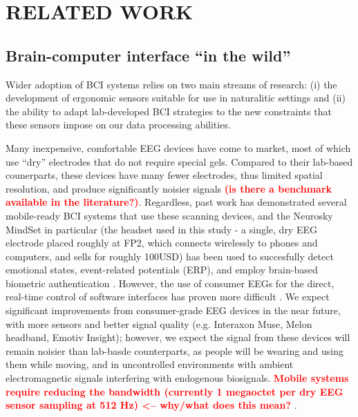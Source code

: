 \section{\uppercase{Related Work}}
\subsection{Brain-computer interface ``in the wild''}

\noindent Wider adoption of BCI systems relies on two main streams of research: (i) the development of ergonomic sensors suitable for use in naturalitic settings and (ii) the ability to adapt lab-developed BCI strategies to the new constraints that these sensors impose on our data processing abilities. 

Many inexpensive, comfortable EEG devices have come to market, most of which use ``dry'' electrodes that do not require special gels. Compared to their lab-based counerparts, these devices have many fewer electrodes, thus limited spatial resolution, and produce significantly noisier signals \textcolor{red}{\bf (is there a benchmark available in the literature?)}. Regardless, past work has demonstrated several mobile-ready BCI systems that use these scanning devices, and the Neurosky MindSet in particular (the headset used in this study - a single, dry EEG electrode placed roughly at FP2, which connects wirelessly to phones and computers, and sells for roughly 100USD) has been used to succesfully detect emotional states, event-related potentials (ERP), and employ brain-based biometric authentication \cite{crowley_evaluating_2010,grierson_better_2011,adams_i_2013}.  However, the use of consumer EEGs for the direct, real-time control of software interfaces has proven more difficult \cite{carrino_self-paced_2012,larsen_classification_2011}. We expect significant improvements from consumer-grade EEG devices in the near future, with more sensors and better signal quality (e.g. Interaxon Muse, Melon headband, Emotiv Insight); however, we expect the signal from these devices will remain noisier than lab-basde counterparts, as people will be wearing and using them while moving, and in uncontrolled environments with ambient electromagnetic signals interfering with endogenous biosignals. \textcolor{red}{\bf Mobile systems require reducing the bandwidth (currently 1 megaoctet per dry EEG sensor sampling at 512 Hz) <-- why/what does this mean? }.

